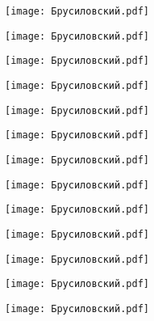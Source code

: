 \documentclass[main.tex]{subfiles}
\begin{document}
\begin{center}
\texttt{[image: Брусиловский.pdf]}
\end{center}

\begin{center}
\texttt{[image: Брусиловский.pdf]}
\end{center}

\begin{center}
\texttt{[image: Брусиловский.pdf]}
\end{center}

\begin{center}
\texttt{[image: Брусиловский.pdf]}
\end{center}

\begin{center}
\texttt{[image: Брусиловский.pdf]}
\end{center}

\begin{center}
\texttt{[image: Брусиловский.pdf]}
\end{center}

\begin{center}
\texttt{[image: Брусиловский.pdf]}
\end{center}

\begin{center}
\texttt{[image: Брусиловский.pdf]}
\end{center}

\begin{center}
\texttt{[image: Брусиловский.pdf]}
\end{center}

\begin{center}
\texttt{[image: Брусиловский.pdf]}
\end{center}

\begin{center}
\texttt{[image: Брусиловский.pdf]}
\end{center}

\begin{center}
\texttt{[image: Брусиловский.pdf]}
\end{center}

\begin{center}
\texttt{[image: Брусиловский.pdf]}
\end{center}
\end{document}
